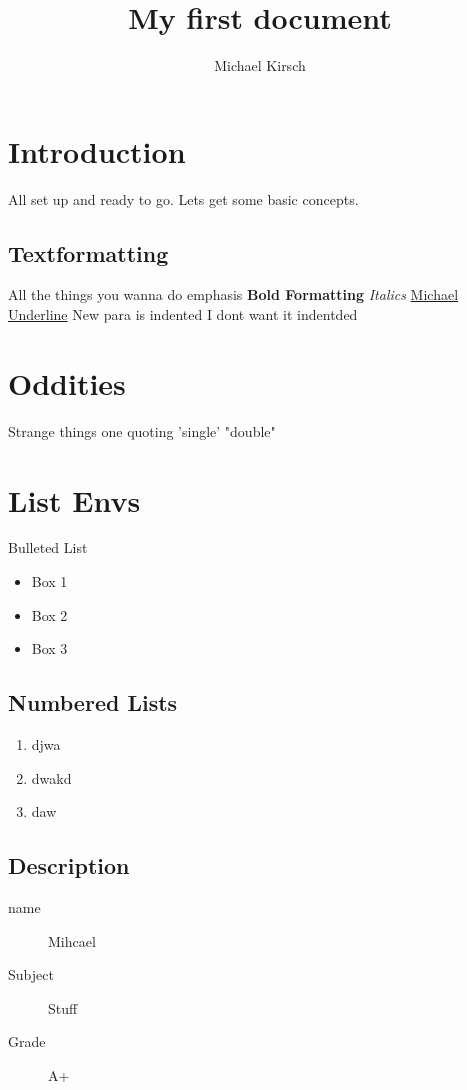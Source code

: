 \documentclass[11pt]{article}
\title{My first document}
\author{Michael Kirsch}
\begin{document}
    \maketitle


    \section{Introduction}
    All set up and ready to go. Lets get some basic concepts.

    \subsection{Textformatting}
    All the things you wanna do emphasis
    \textbf{Bold Formatting}
    \emph{Italics}
    \underline{Michael Underline}
    New para is indented
    \noindent I dont want it indentded


    \section{Oddities}
    Strange things one quoting
    'single' "double"


    \section{List Envs}
    Bulleted List
    \begin{itemize}
        \item Box 1
        \item Box 2
        \item Box 3
    \end{itemize}

    \subsection{Numbered Lists}
    \begin{enumerate}
        \item djwa
        \item dwakd
        \item daw
    \end{enumerate}

    \subsection{Description}
    \begin{description}
        \item [name] Mihcael
        \item[Subject] Stuff
        \item[Grade] A+
    \end{description}
\end{document}
